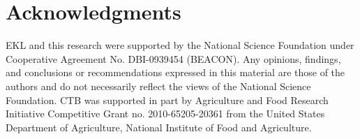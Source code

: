 \section*{Acknowledgments}

EKL and this research were supported by the National Science
Foundation under Cooperative Agreement No. DBI-0939454 (BEACON). Any
opinions, findings, and conclusions or recommendations expressed in
this material are those of the authors and do not necessarily reflect
the views of the National Science Foundation.  CTB was supported in
part by Agriculture and Food Research Initiative Competitive Grant
no. 2010-65205-20361 from the United States Department of Agriculture,
National Institute of Food and Agriculture.

